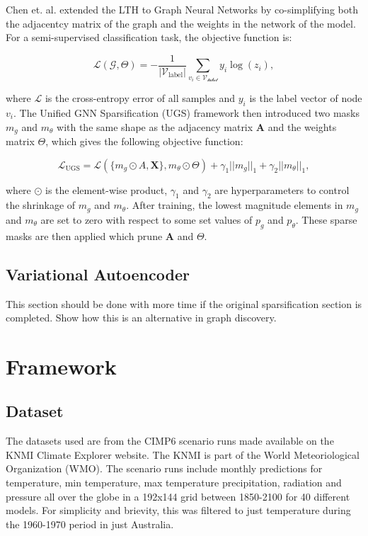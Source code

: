 \documentclass[honours,12pt]{unswthesis}
\numberwithin{equation}{section}
\begin{document}
Chen et. al.\cite{chen2021unified} extended the LTH to Graph Neural Networks by co-simplifying both the adjacentcy matrix of the graph and the weights in 
the network of the model. For a semi-supervised classification task, the objective function is:

\begin{equation}
    \mathcal{L}(\mathcal{G}, \Theta) = -\frac{1}{|\mathcal{V}_{\text{label}}|}\sum_{v_i \in \mathcal{V_{\text{label}}}} y_i \log{(z_i)},
\end{equation}

where $\mathcal{L}$ is the cross-entropy error of all samples and $y_i$ is the label vector of node $v_i$. The Unified GNN Sparsification (UGS)
framework then introduced two masks $m_g$ and $m_\theta$ with the same shape as the adjacency matrix $\textbf{A}$ and the weights matrix $\Theta$, which
gives the following objective function:

\begin{equation}
    \mathcal{L}_{\text{UGS}} = \mathcal{L}(\{m_g \odot A, \textbf{X}\}, m_\theta \odot \Theta) + \gamma_1 ||m_g||_1 + \gamma_2 ||m_\theta||_1,
\end{equation}

where $\odot$ is the element-wise product, $\gamma_1$ and $\gamma_2$ are hyperparameters to control the shrinkage of $m_g$ and $m_\theta$.
After training, the lowest magnitude elements in $m_g$ and $m_\theta$ are set to zero with respect to some set values of $p_g$ and $p_\theta$.
These sparse masks are then applied which prune $\textbf{A}$ and $\Theta$.

\section{Variational Autoencoder}\label{vae}
This section should be done with more time if the original sparsification section is completed.
Show how this is an alternative in graph discovery.




\chapter{Framework}\label{framework}



\section{Dataset}\label{data}
The datasets used are from the CIMP6 scenario runs made available on the KNMI Climate Explorer website. The KNMI is part of the
World Meteoriological Organization (WMO)\cite{}. The scenario runs include monthly predictions for temperature, min temperature, max temperature
precipitation, radiation and pressure all over the globe in a 192x144 grid between 1850-2100 for 40 different models. For simplicity and brievity, 
this was filtered to just temperature during the 1960-1970 period in just Australia. 
\end{document}
